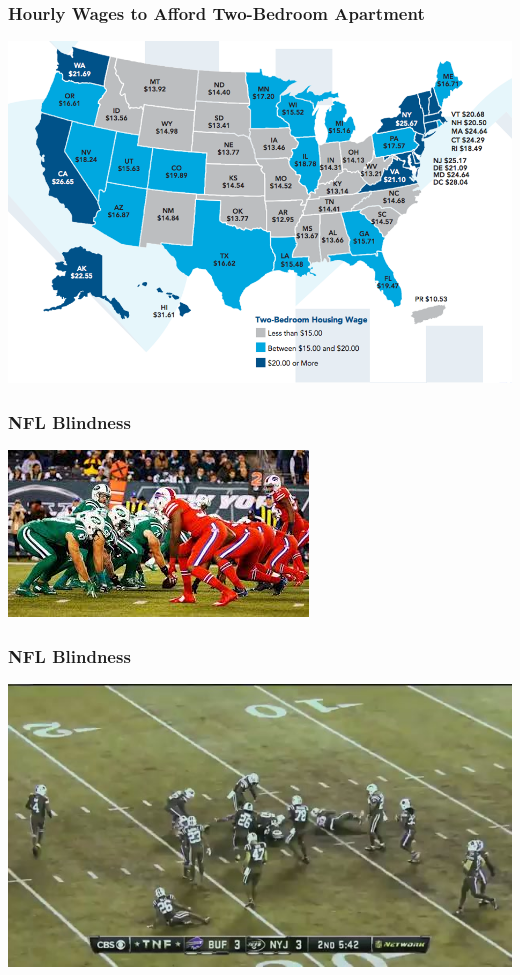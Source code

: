 \documentclass{beamer} %
\begin{document}
\begin{frame}\frametitle{Hourly Wages to Afford Two-Bedroom Apartment}
	\includegraphics[width=\linewidth]{hourly.png}
\end{frame}


\begin{frame}\frametitle{NFL Blindness}
	\centering
	\includegraphics[width=\linewidth]{nfl1.jpg}
\end{frame}

\begin{frame}\frametitle{NFL Blindness}
	\centering
	\includegraphics[width=\linewidth]{nfl2.jpg}
\end{frame}
\end{document}
